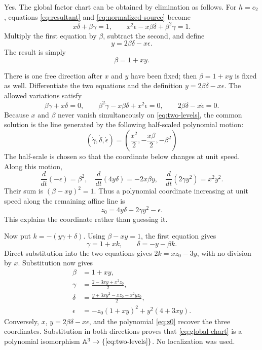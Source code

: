 \documentclass[11pt,a4paper]{article}
\numberwithin{equation}{section}
\theoremstyle{definition}
\theoremstyle{remark}
\newcommand{\A}{\mathbb A}
\newenvironment{modelanswer}
  {\par\smallskip\noindent{\color{modelgreen}\bfseries MODEL}\par\smallskip}
  {\par\medskip}
\begin{document}
\begin{modelanswer}
Yes.  The global factor chart can be obtained by elimination as follows.  For
\(h=c_2\), equations \eqref{eq:resultant} and
\eqref{eq:normalized-source} become
\begin{equation}\label{eq:two-levels}
 x\delta+\beta\gamma=1,
 \qquad
 x^2\epsilon-x\beta\delta+\beta^2\gamma=1.
\end{equation}
Multiply the first equation by \(\beta\), subtract the second, and define
\[
  y=2\beta\delta-x\epsilon.
\]
The result is simply
\begin{equation}\label{eq:beta}
  \beta=1+xy.
\end{equation}

There is one free direction after \(x\) and \(y\) have been fixed; then
\(\beta=1+xy\) is fixed as well.  Differentiate the two equations and the
definition \(y=2\beta\delta-x\epsilon\).  The allowed variations satisfy
\[
 \beta\dot\gamma+x\dot\delta=0,
 \qquad
 \beta^2\dot\gamma-x\beta\dot\delta+x^2\dot\epsilon=0,
 \qquad
 2\beta\dot\delta-x\dot\epsilon=0.
\]
Because \(x\) and \(\beta\) never vanish simultaneously on
\eqref{eq:two-levels}, the common solution is the line generated by the
following half-scaled polynomial motion:
\begin{equation}\label{eq:line-motion}
 (\dot\gamma,\dot\delta,\dot\epsilon)
 =\left(\frac{x^2}{2},-\frac{x\beta}{2},-\beta^2\right)
\end{equation}
The half-scale is chosen so that the coordinate below changes at unit speed.
Along this motion,
\[
 \frac{d}{dt}(-\epsilon)=\beta^2,
 \quad
 \frac{d}{dt}(4y\delta)=-2x\beta y,
 \quad
 \frac{d}{dt}(2\gamma y^2)=x^2y^2.
\]
Their sum is \((\beta-xy)^2=1\).  Thus a polynomial coordinate increasing at
unit speed along the remaining affine line is
\begin{equation}\label{eq:z0}
  z_0=4y\delta+2\gamma y^2-\epsilon.
\end{equation}
This explains the coordinate rather than guessing it.

Now put \(k=-(y\gamma+\delta)\).  Using \(\beta-xy=1\), the first equation
gives
\[
  \gamma=1+xk,
  \qquad
  \delta=-y-\beta k.
\]
Direct substitution into the two equations gives \(2k=xz_0-3y\), with no
division by \(x\).  Substitution now gives
\begin{equation}\label{eq:global-chart}
\boxed{
\begin{aligned}
\beta&=1+xy,\\
\gamma&=\frac{2-3xy+x^2z_0}{2},\\
\delta&=\frac{y+3xy^2-xz_0-x^2yz_0}{2},\\
\epsilon&=-z_0(1+xy)^2+y^2(4+3xy).
\end{aligned}}
\end{equation}
Conversely, \(x\), \(y=2\beta\delta-x\epsilon\), and the polynomial
\eqref{eq:z0} recover the three coordinates.  Substitution in both directions
proves that \eqref{eq:global-chart} is a polynomial isomorphism
\(\A^3\to\{\eqref{eq:two-levels}\}\).  No localization was used.


\end{modelanswer}
\end{document}
